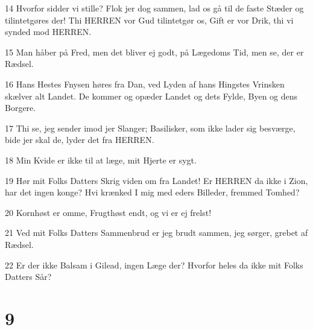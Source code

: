 \par 14 Hvorfor sidder vi stille? Flok jer dog sammen, lad os gå til de faste Stæder og tilintetgøres der! Thi HERREN vor Gud tilintetgør os, Gift er vor Drik, thi vi synded mod HERREN.
\par 15 Man håber på Fred, men det bliver ej godt, på Lægedoms Tid, men se, der er Rædsel.
\par 16 Hans Hestes Fnysen høres fra Dan, ved Lyden af hans Hingstes Vrinsken skælver alt Landet. De kommer og opæder Landet og dets Fylde, Byen og dens Borgere.
\par 17 Thi se, jeg sender imod jer Slanger; Basilisker, som ikke lader sig besværge, bide jer skal de, lyder det fra HERREN.
\par 18 Min Kvide er ikke til at læge, mit Hjerte er sygt.
\par 19 Hør mit Folks Datters Skrig viden om fra Landet! Er HERREN da ikke i Zion, har det ingen konge? Hvi krænked I mig med eders Billeder, fremmed Tomhed?
\par 20 Kornhøst er omme, Frugthøst endt, og vi er ej frelst!
\par 21 Ved mit Folks Datters Sammenbrud er jeg brudt sammen, jeg sørger, grebet af Rædsel.
\par 22 Er der ikke Balsam i Gilead, ingen Læge der? Hvorfor heles da ikke mit Folks Datters Sår?

\chapter{9}

